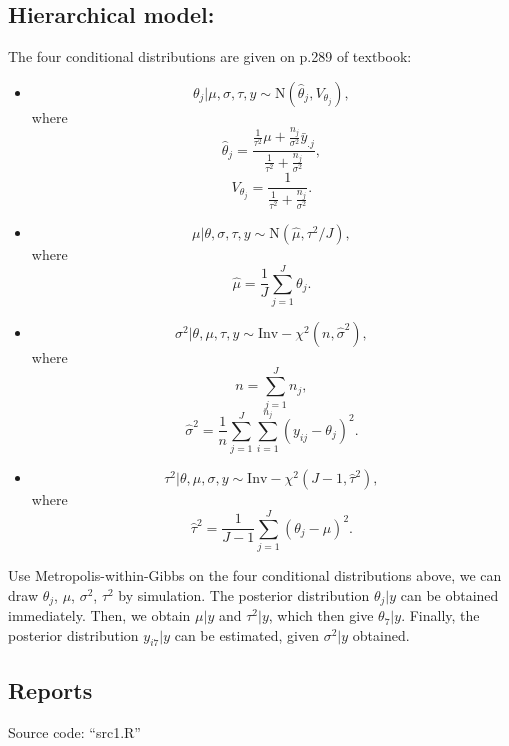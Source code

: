 \documentclass{article}
\begin{document}
{{\begin{itemize}
        \end{itemize}
    }

    \subsection*{Hierarchical model:}
    {
        The four conditional distributions are given on p.289 of textbook:

        \begin{itemize}

        \item $$\theta_j | \mu, \sigma, \tau, y \sim \mathrm{N}(\hat{\theta}_j, V_{\theta_j}),$$ where
        $$\hat{\theta}_j = \frac{ \frac{1}{\tau^2}\mu + \frac{n_j}{\sigma^2}\bar{y}_{.j} }{ \frac{1}{\tau^2} + \frac{n_j}{\sigma^2} },$$
        $$V_{\theta_j} = \frac{1}{ \frac{1}{\tau^2} + \frac{n_j}{\sigma^2} }.$$

        \item $$\mu | \theta, \sigma, \tau, y \sim \mathrm{N}(\hat{\mu}, \tau^2/J),$$ where
        $$\hat{\mu} = \frac{1}{J} \sum_{j=1}^{J} \theta_j.$$

        \item $$\sigma^2 | \theta, \mu, \tau, y \sim \mathrm{Inv-}\chi^2 (n, \hat{\sigma}^2),$$ where
        $$n = \sum_{j=1}^{J} n_j,$$
        $$\hat{\sigma}^2 = \frac{1}{n} \sum_{j=1}^{J} \sum_{i=1}^{n_j} (y_{ij} - \theta_j)^2.$$

        \item $$\tau^2 | \theta, \mu, \sigma, y \sim \mathrm{Inv-}\chi^2 (J-1, \hat{\tau}^2),$$ where
        $$\hat{\tau}^2 = \frac{1}{J-1} \sum_{j=1}^{J} (\theta_j - \mu)^2.$$

        \end{itemize}

        Use Metropolis-within-Gibbs on the four conditional distributions above, we can draw $\theta_j$, $\mu$, $\sigma^2$, $\tau^2$ by simulation.
        The posterior distribution $\theta_j | y$ can be obtained immediately. 
        Then, we obtain $\mu | y$ and $\tau^2 | y$, which then give $\theta_7 | y$. 
        Finally, the posterior distribution $y_{i7} | y$ can be estimated, given $\sigma^2 | y$ obtained.
    }

    \subsection*{Reports}
    {
        Source code: ``src1.R''

}}
\end{document}
